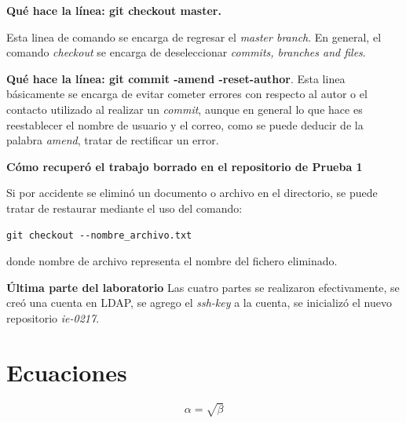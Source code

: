 \documentclass{article}
\begin{document}
\textbf{Qu\' e hace la l\' inea: git checkout master.}

Esta linea de comando se encarga de regresar el \textit{master branch}.
En general, el comando \textit{checkout} se encarga de deseleccionar \textit{commits, branches and files}.

\textbf{Qu\' e hace la l\' inea: git commit -amend -reset-author}.
Esta linea b\' asicamente se encarga de evitar cometer errores con respecto al autor o el contacto utilizado al realizar un \textit{commit}, aunque en general lo que hace es reestablecer el nombre de usuario y el correo, como se puede deducir de la palabra \textit{amend}, tratar de rectificar un error.

\textbf{C\' omo recuper\' o el trabajo borrado en el repositorio de Prueba 1}

Si por accidente se elimin\' o un documento o archivo en el directorio, se puede tratar de restaurar mediante el uso del comando: 
\begin{verbatim}
git checkout --nombre_archivo.txt
\end{verbatim}
donde nombre de archivo representa el nombre del fichero eliminado.


\textbf{\' Ultima parte del laboratorio}
Las cuatro partes se realizaron efectivamente, se cre\' o una cuenta en LDAP, se agrego el \textit{ssh-key} a la cuenta, se inicializ\' o el nuevo repositorio \textit{ie-0217}.



\section{Ecuaciones}
\begin{equation}
\label{etiqueta de ecuacion}
\alpha=\sqrt{\beta}
\end{equation}
\end{document}
